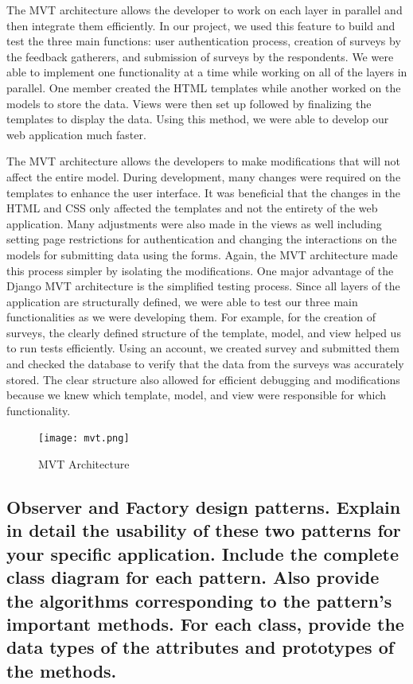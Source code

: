 \documentclass[letterpaper, 12 pt, conference]{ieeeconf}
\begin{document}
The MVT architecture allows the developer to work on each layer in parallel and then integrate them efficiently. In our project, we used this feature to build and test the three main functions: user authentication process, creation of surveys by the feedback gatherers, and submission of surveys by the respondents. We were able to implement one functionality at a time while working on all of the layers in parallel. One member created the HTML templates while another worked on the models to store the data. Views were then set up followed by finalizing the templates to display the data. Using this method, we were able to develop our web application much faster.
\newline

The MVT architecture allows the developers to make modifications that will not affect the entire model. During development, many changes were required on the templates to enhance the user interface. It was beneficial that the changes in the HTML and CSS only affected the templates and not the entirety of the web application. Many adjustments were also made in the views as well including setting page restrictions for authentication and changing the interactions on the models for submitting data using the forms. Again, the MVT architecture made this process simpler by isolating the modifications.
\newline
\newpage
One major advantage of the Django MVT architecture is the simplified testing process. Since all layers of the application are structurally defined, we were able to test our three main functionalities as we were developing them. For example, for the creation of surveys, the clearly defined structure of the template, model, and view helped us to run tests efficiently. Using an account, we created survey and submitted them and checked the database to verify that the data from the surveys was accurately stored. The clear structure also allowed for efficient debugging and modifications because we knew which template, model, and view were responsible for which functionality.
\newline


\begin{figure}[h]
        \centering
        \texttt{[image: mvt.png]}
        \caption{MVT Architecture}
    \end{figure}

    \newpage
    
\subsection{Observer and Factory design patterns. Explain in detail the usability of these two patterns for your specific application. Include the complete class diagram for each pattern. Also provide the algorithms corresponding to the pattern’s important methods. For each class, provide the data types of the attributes and prototypes of the methods.}
\end{document}
